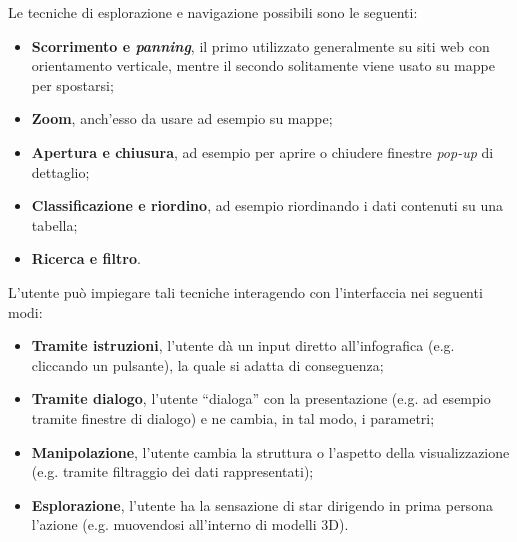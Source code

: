 Le tecniche di esplorazione e navigazione possibili sono le seguenti:
\begin{itemize}
    \item \textbf{Scorrimento e \emph{panning}}, il primo utilizzato generalmente su siti web con orientamento verticale, mentre il secondo solitamente viene usato su mappe per spostarsi;
    \item \textbf{Zoom}, anch'esso da usare ad esempio su mappe;
    \item \textbf{Apertura e chiusura}, ad esempio per aprire o chiudere finestre \emph{pop-up} di dettaglio;
    \item \textbf{Classificazione e riordino}, ad esempio riordinando i dati contenuti su una tabella;
    \item \textbf{Ricerca e filtro}.
\end{itemize}
L'utente può impiegare tali tecniche interagendo con l'interfaccia nei seguenti modi:
\begin{itemize}
    \item \textbf{Tramite istruzioni}, l'utente dà un input diretto all'infografica (e.g. cliccando un pulsante), la quale si adatta di conseguenza;
    \item \textbf{Tramite dialogo}, l'utente ``dialoga'' con la presentazione (e.g. ad esempio tramite finestre di dialogo) e ne cambia, in tal modo, i parametri;
    \item \textbf{Manipolazione}, l'utente cambia la struttura o l'aspetto della visualizzazione (e.g. tramite filtraggio dei dati rappresentati);
    \item \textbf{Esplorazione}, l'utente ha la sensazione di star dirigendo in prima persona l'azione (e.g. muovendosi all'interno di modelli 3D).
\end{itemize}

